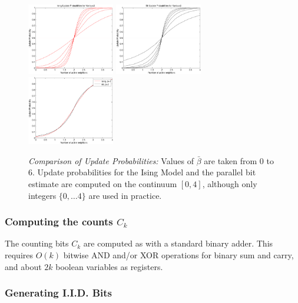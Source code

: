 \begin{figure}
\includegraphics[width=1.5in]{Parallel_Bits/isingup}\quad
\includegraphics[width=1.5in]{Parallel_Bits/bitup}\quad
\includegraphics[width=1.5in]{Parallel_Bits/parcompare}
\caption{\emph{Comparison of Update Probabilities:} 
Values of $\bar\beta$ are taken from 0 to 6.  
Update probabilities for the Ising Model and
the parallel bit estimate are computed on the continuum $[0,4]$, 
although only integers $\{0, \ldots 4\}$ are used in practice.\label{fig: parcompare}}
\end{figure}
\subsubsection{Computing the counts $C_k$}

The counting bits $C_k$ are computed as with a standard binary adder.  
This requires $O(k)$ bitwise AND and/or XOR operations for binary sum and carry,
and about $2k$ boolean variables as registers.

\subsubsection{Generating I.I.D. Bits}

